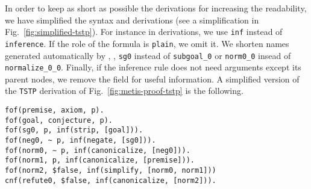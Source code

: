 \documentclass[../main.tex]{subfiles}
\begin{document}
\begin{remark}
In order to keep as short as possible the \Metis derivations 
for increasing the readability, we have simplified the \TSTP
syntax and \Metis derivations (see a simplification in Fig.~\ref{fig:simplified-tstp}).
For instance in \TSTP derivations, we use \verb!inf! instead of \verb!inference!. If the role of the formula is \verb!plain!, we omit it.
We shorten names generated automatically by \Metis, \eg,
\verb!sg0! instead of \verb!subgoal_0! or \verb!norm0_0!
insead of \verb!normalize_0_0!.
Finally, if the inference rule does not need arguments except its parent nodes, we remove the field for useful information.
A simplified version of the \texttt{TSTP} derivation of Fig.~\ref{fig:metis-proof-tstp} is the following.

\begin{verbatim}
fof(premise, axiom, p).
fof(goal, conjecture, p).
fof(sg0, p, inf(strip, [goal])).
fof(neg0, ~ p, inf(negate, [sg0])).
fof(norm0, ∼ p, inf(canonicalize, [neg0])).
fof(norm1, p, inf(canonicalize, [premise])).
fof(norm2, $false, inf(simplify, [norm0, norm1]))
cnf(refute0, $false, inf(canonicalize, [norm2])).
\end{verbatim}

\end{remark}
\end{document}
